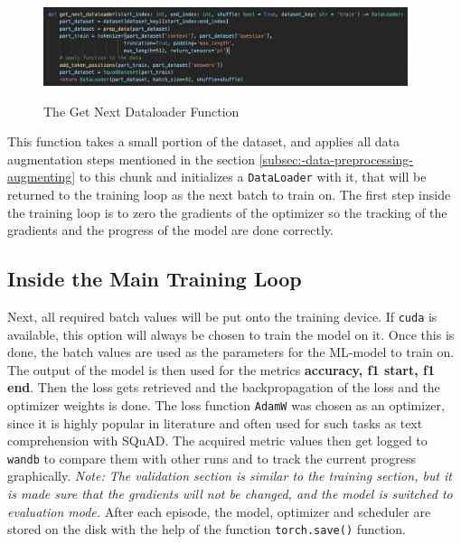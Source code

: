             \begin{figure}[h!]
                \centering
                \caption{The Get Next Dataloader Function \cite[\texttt{bert\_training.ipynb}]{innerProject}}
                \includegraphics[width=0.95\textwidth]{figures/get_next_dataloader.png}
                \label{fig:-get-next-dataloader}
            \end{figure}
        This function takes a small portion of the dataset, and applies all data augmentation steps mentioned in the section \ref{subsec:-data-preprocessing-augmenting} to this chunk and initializes a \texttt{DataLoader} with it, that will be returned to the training loop as the next batch to train on.
        The first step inside the training loop is to zero the gradients of the optimizer so the tracking of the gradients and the progress of the model are done correctly.

        \subsection{Inside the Main Training Loop}
        \label{sec:-inside-the-main-training-loop}
            Next, all required batch values will be put onto the training device. If \texttt{cuda} is available, this option will always be chosen to train the model on it.
            Once this is done, the batch values are used as the parameters for the ML-model to train on.
            The output of the model is then used for the metrics \textbf{accuracy, f1 start, f1 end}.
            Then the loss gets retrieved and the backpropagation of the loss and the optimizer weights is done.
            The loss function \texttt{AdamW} was chosen as an optimizer, since it is highly popular in literature and often used for such tasks as text comprehension with SQuAD.
            The acquired metric values then get logged to \texttt{wandb} to compare them with other runs and to track the current progress graphically.
            \emph{Note: The validation section is similar to the training section, but it is made sure that the gradients will not be changed, and the model is switched to evaluation mode.}
            After each episode, the model, optimizer and scheduler are stored on the disk with the help of the function \texttt{torch.save()} function.

